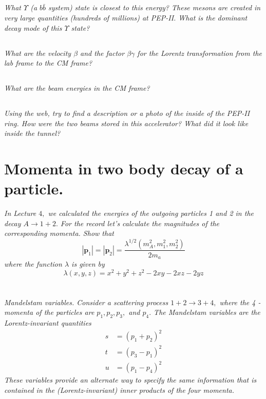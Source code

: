 \documentclass{article}
\begin{document}
\subsection{}
\textit{What $\Upsilon$ (a $b \bar{b}$ system) state is closest to this energy? These mesons are created in very large quantities (hundreds of millions) at PEP-II. What is the dominant decay mode of this $\Upsilon$ state?}

\subsection{}
\textit{What are the velocity $\beta$ and the factor $\beta \gamma$ for the Lorentz transformation from the lab frame to the CM frame?}


\subsection{}
\textit{What are the beam energies in the CM frame?}


\subsection{}
\textit{Using the web, try to find a description or a photo of the inside of the PEP-II ring. How were the two beams stored in this accelerator? What did it look like inside the tunnel?}



\newpage


\section{Momenta in two body decay of a particle. }
\textit{In Lecture $4,$ we calculated the energies of the outgoing particles 1 and 2 in the decay $A \rightarrow 1+2 .$ For the record let's calculate the magnitudes of the corresponding momenta. Show that
$$
\left|\mathbf{p}_{1}\right|=\left|\mathbf{p}_{2}\right|=\frac{\lambda^{1 / 2}\left(m_{A}^{2}, m_{1}^{2}, m_{2}^{2}\right)}{2 m_{a}}
$$
where the function $\lambda$ is given by
$$
\lambda(x, y, z)=x^{2}+y^{2}+z^{2}-2 x y-2 x z-2 y z
$$}

\newpage


\section{}
\textit{Mandelstam variables. Consider a scattering process $1+2 \rightarrow 3+4,$ where the 4 -momenta of the particles are $p_{1}, p_{2}, p_{3},$ and $p_{4} .$ The Mandelstam variables are the Lorentz-invariant quantities
$$
\begin{aligned}
s &=\left(p_{1}+p_{2}\right)^{2} \\
t &=\left(p_{3}-p_{1}\right)^{2} \\
u &=\left(p_{1}-p_{4}\right)^{2}
\end{aligned}
$$
These variables provide an alternate way to specify the same information that is contained in the (Lorentz-invariant) inner products of the four momenta.}
\end{document}

